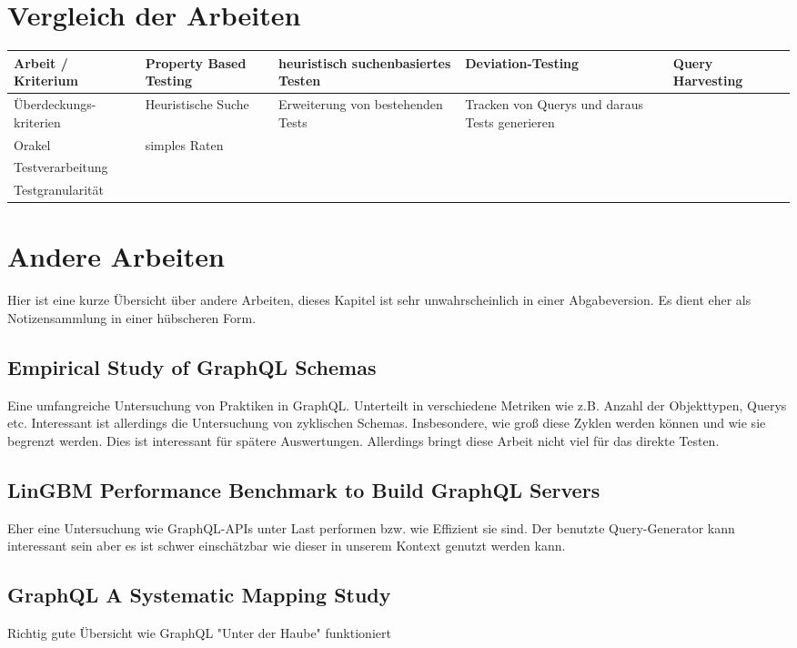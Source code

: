 \section{Vergleich der Arbeiten}

\begin{center}
    \begin{table}[!ht]
        \begin{tabularx}{\textwidth}{|C|C|C|C|C|C|}
            \hline
            \textbf{ Arbeit / Kriterium} & \textbf{Property Based Testing} & \textbf{heuristisch suchenbasiertes Testen} & \textbf{Deviation-Testing} & \textbf{Query Harvesting} \\
            \hline
            Überdeckungs- kriterien & Heuristische Suche & Erweiterung von bestehenden Tests & Tracken von Querys und daraus Tests generieren & \\
            \hline
            Orakel & simples Raten &  & &\\
            \hline
            Testverarbeitung & & & &\\
            \hline
            Testgranularität & & & &\\
            \hline
        \end{tabularx}
    \end{table}
\end{center}

\section{Andere Arbeiten}
Hier ist eine kurze Übersicht über andere Arbeiten, dieses Kapitel ist sehr unwahrscheinlich in einer Abgabeversion.
Es dient eher als Notizensammlung in einer hübscheren Form.

\subsection{Empirical Study of GraphQL Schemas}
Eine umfangreiche Untersuchung von Praktiken in GraphQL. Unterteilt in verschiedene Metriken wie z.B.
Anzahl der Objekttypen, Querys etc.
Interessant ist allerdings die Untersuchung von zyklischen Schemas. Insbesondere, wie groß diese Zyklen
werden können und wie sie begrenzt werden. Dies ist interessant für spätere Auswertungen. Allerdings bringt
diese Arbeit nicht viel für das direkte Testen.

\subsection{LinGBM Performance Benchmark to Build GraphQL Servers}
Eher eine Untersuchung wie GraphQL-APIs unter Last performen bzw. wie Effizient sie sind.
Der benutzte Query-Generator kann interessant sein aber es ist schwer einschätzbar wie dieser in unserem Kontext genutzt werden
kann.

\subsection{GraphQL A Systematic Mapping Study}
Richtig gute Übersicht wie GraphQL "Unter der Haube" funktioniert


